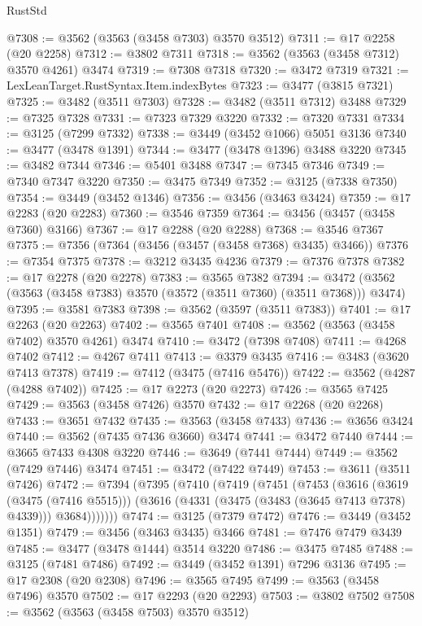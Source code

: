 \begin{lexlean}{RustStd}
\begin{coremodule}
@7308 := @3562 (@3563 (@3458 @7303) @3570 @3512)
@7311 := @17 @2258 (@20 @2258)
@7312 := @3802 @7311
@7318 := @3562 (@3563 (@3458 @7312) @3570 @4261) @3474
@7319 := @7308 @7318
@7320 := @3472 @7319
@7321 := LexLeanTarget.RustSyntax.Item.indexBytes
@7323 := @3477 (@3815 @7321)
@7325 := @3482 (@3511 @7303)
@7328 := @3482 (@3511 @7312) @3488
@7329 := @7325 @7328
@7331 := @7323 @7329 @3220
@7332 := @7320 @7331
@7334 := @3125 (@7299 @7332)
@7338 := @3449 (@3452 @1066) @5051 @3136
@7340 := @3477 (@3478 @1391)
@7344 := @3477 (@3478 @1396) @3488 @3220
@7345 := @3482 @7344
@7346 := @5401 @3488
@7347 := @7345 @7346
@7349 := @7340 @7347 @3220
@7350 := @3475 @7349
@7352 := @3125 (@7338 @7350)
@7354 := @3449 (@3452 @1346)
@7356 := @3456 (@3463 @3424)
@7359 := @17 @2283 (@20 @2283)
@7360 := @3546 @7359
@7364 := @3456 (@3457 (@3458 @7360) @3166)
@7367 := @17 @2288 (@20 @2288)
@7368 := @3546 @7367
@7375 := @7356 (@7364 (@3456 (@3457 (@3458 @7368) @3435) @3466))
@7376 := @7354 @7375
@7378 := @3212 @3435 @4236
@7379 := @7376 @7378
@7382 := @17 @2278 (@20 @2278)
@7383 := @3565 @7382
@7394 := @3472 (@3562 (@3563 (@3458 @7383) @3570 (@3572 (@3511 @7360) (@3511 @7368))) @3474)
@7395 := @3581 @7383
@7398 := @3562 (@3597 (@3511 @7383))
@7401 := @17 @2263 (@20 @2263)
@7402 := @3565 @7401
@7408 := @3562 (@3563 (@3458 @7402) @3570 @4261) @3474
@7410 := @3472 (@7398 @7408)
@7411 := @4268 @7402
@7412 := @4267 @7411
@7413 := @3379 @3435
@7416 := @3483 (@3620 @7413 @7378)
@7419 := @7412 (@3475 (@7416 @5476))
@7422 := @3562 (@4287 (@4288 @7402))
@7425 := @17 @2273 (@20 @2273)
@7426 := @3565 @7425
@7429 := @3563 (@3458 @7426) @3570
@7432 := @17 @2268 (@20 @2268)
@7433 := @3651 @7432
@7435 := @3563 (@3458 @7433)
@7436 := @3656 @3424
@7440 := @3562 (@7435 @7436 @3660) @3474
@7441 := @3472 @7440
@7444 := @3665 @7433 @4308 @3220
@7446 := @3649 (@7441 @7444)
@7449 := @3562 (@7429 @7446) @3474
@7451 := @3472 (@7422 @7449)
@7453 := @3611 (@3511 @7426)
@7472 := @7394
    (@7395
      (@7410
        (@7419
          (@7451
            (@7453
              (@3616
                (@3619 (@3475 (@7416 @5515)))
                (@3616 (@4331 (@3475 (@3483 (@3645 @7413 @7378) @4339))) @3684)))))))
@7474 := @3125 (@7379 @7472)
@7476 := @3449 (@3452 @1351)
@7479 := @3456 (@3463 @3435) @3466
@7481 := @7476 @7479 @3439
@7485 := @3477 (@3478 @1444) @3514 @3220
@7486 := @3475 @7485
@7488 := @3125 (@7481 @7486)
@7492 := @3449 (@3452 @1391) @7296 @3136
@7495 := @17 @2308 (@20 @2308)
@7496 := @3565 @7495
@7499 := @3563 (@3458 @7496) @3570
@7502 := @17 @2293 (@20 @2293)
@7503 := @3802 @7502
@7508 := @3562 (@3563 (@3458 @7503) @3570 @3512)

\end{coremodule}
\end{lexlean}
